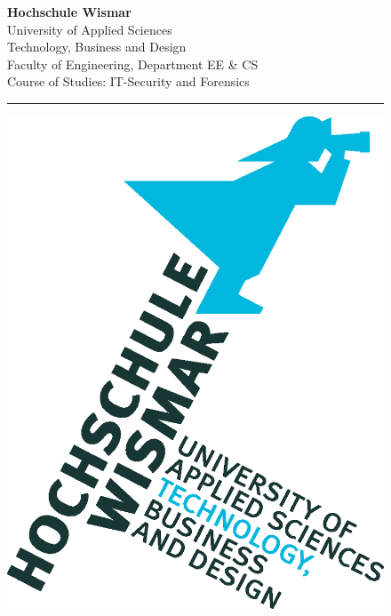 \begin{titlepage}
	\setlength\headsep{-5mm}
	\begin{figure}[!h]
		\begin{minipage}{0.8\textwidth}
			\textbf{Hochschule Wismar} \\
			University of Applied Sciences \\
			Technology, Business and Design \\
			Faculty of Engineering, Department EE \&{} CS \\
			Course of Studies: IT-Security and Forensics\\
		\rule{\textwidth}{0.5pt}
		\end{minipage}
		\begin{minipage}[r]{0.1\textwidth}
			\begin{flushright}
				\includegraphics[height=6\baselineskip]{pics/HS-Wismar_Logo-FIW_V1_4C.eps}
			\end{flushright}
		\end{minipage}

\end{figure}
\end{titlepage}

